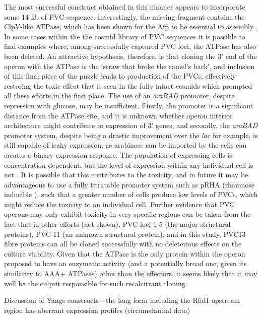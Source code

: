 The most successful construct obtained in this manner appears to incorporate some 14 kb of PVC sequence. Interestingly, the missing fragment contains the ClpV-like ATPase, which has been shown for the Afp to be essential to assembly \citep{Rybakova2015}. In some cases within the the cosmid library of PVC sequences it is possible to find examples where, among successfully captured PVC loci, the ATPase has also been deleted. An attractive hypothesis, therefore, is that cloning the 3' end of the operon with the ATPase is the `straw that broke the camel's back', and inclusion of this final piece of the puzzle leads to production of the PVCs; effectively restoring the toxic effect that is seen in the fully intact cosmids which prompted all these efforts in the first place. The use of an \emph{araBAD} promoter, despite repression with glucose, may be insufficient. Firstly, the promoter is a significant distance from the ATPase site, and it is unknown whether operon interior architecture might contribute to expression of 3' genes; and secondly, the \emph{araBAD} promoter system, despite being a drastic improvement over the \emph{lac} for example, is still capable of leaky expression, as arabinose can be imported by the cells can creates a binary expression response. The population of expressing cells is concentration dependent, but the level of expression within any individual cell is not \citep{Siegele1997, Khlebnikov2000}. It is possible that this contributes to the toxicity, and in future it may be advantageous to use a fully titratable promoter system such as pRHA (rhamnose inducible \citep{Giacalone2006}), such that a greater number of cells produce low levels of PVCs, which might reduce the toxicity to an individual cell. Further evidence that PVC operons may only exhibit toxicity in very specific regions can be taken from the fact that in other efforts (not shown), PVC loci 1-5 (the major structural proteins), PVC 11 (an unknown structural protein), and in this study, PVC13 fibre proteins can all be cloned successfully with no deleterious effects on the culture viability. Given that the ATPase is the only protein within the operon proposed to have an enzymatic activity (and a potentially broad one, given its similarity to AAA+ ATPases) other than the effectors, it seems likely that it may well be the culprit responsible for such recalcitrant cloning.


Discussion of Yangs constructs - the long form including the RfaH upstream region has aberrant expression profiles (circumstantial data)


